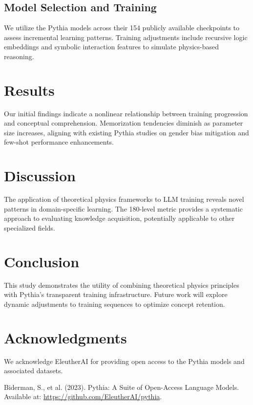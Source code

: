\documentclass[12pt]{article}
\begin{document}
\subsection{Model Selection and Training}
We utilize the Pythia models across their 154 publicly available checkpoints to assess incremental learning patterns. Training adjustments include recursive logic embeddings and symbolic interaction features to simulate physics-based reasoning.

\section{Results}
Our initial findings indicate a nonlinear relationship between training progression and conceptual comprehension. Memorization tendencies diminish as parameter size increases, aligning with existing Pythia studies on gender bias mitigation and few-shot performance enhancements.

\section{Discussion}
The application of theoretical physics frameworks to LLM training reveals novel patterns in domain-specific learning. The 180-level metric provides a systematic approach to evaluating knowledge acquisition, potentially applicable to other specialized fields.

\section{Conclusion}
This study demonstrates the utility of combining theoretical physics principles with Pythia's transparent training infrastructure. Future work will explore dynamic adjustments to training sequences to optimize concept retention.

\section*{Acknowledgments}
We acknowledge EleutherAI for providing open access to the Pythia models and associated datasets.

\begin{thebibliography}{1}
 Biderman, S., et al. (2023). Pythia: A Suite of Open-Access Language Models. Available at: \url{https://github.com/EleutherAI/pythia}.
\end{thebibliography}
\end{document}
